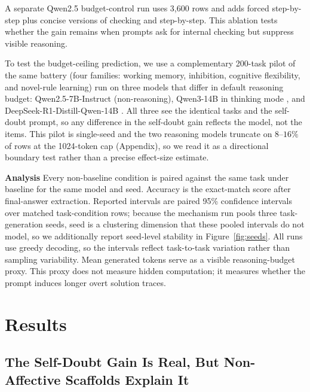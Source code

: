\documentclass{article}
\begin{document}
A separate Qwen2.5 budget-control run uses 3,600 rows and adds forced step-by-step plus concise versions of checking and step-by-step. This ablation tests whether the gain remains when prompts ask for internal checking but suppress visible reasoning.

To test the budget-ceiling prediction, we use a complementary 200-task pilot of the same battery (four families: working memory, inhibition, cognitive flexibility, and novel-rule learning) run on three models that differ in default reasoning budget: Qwen2.5-7B-Instruct (non-reasoning), Qwen3-14B in thinking mode \citep{yang2025qwen3}, and DeepSeek-R1-Distill-Qwen-14B \citep{deepseekai2025r1}. All three see the identical tasks and the self-doubt prompt, so any difference in the self-doubt gain reflects the model, not the items. This pilot is single-seed and the two reasoning models truncate on $8$--$16\%$ of rows at the 1024-token cap (Appendix), so we read it as a directional boundary test rather than a precise effect-size estimate.

\noindent \par{\textbf{Analysis}} Every non-baseline condition is paired against the same task under baseline for the same model and seed. Accuracy is the exact-match score after final-answer extraction. Reported intervals are paired 95\% confidence intervals over matched task-condition rows; because the mechanism run pools three task-generation seeds, seed is a clustering dimension that these pooled intervals do not model, so we additionally report seed-level stability in Figure~\ref{fig:seeds}. All runs use greedy decoding, so the intervals reflect task-to-task variation rather than sampling variability. Mean generated tokens serve as a visible reasoning-budget proxy. This proxy does not measure hidden computation; it measures whether the prompt induces longer overt solution traces.

\section{Results}

\subsection{The Self-Doubt Gain Is Real, But Non-Affective Scaffolds Explain It}
\end{document}
